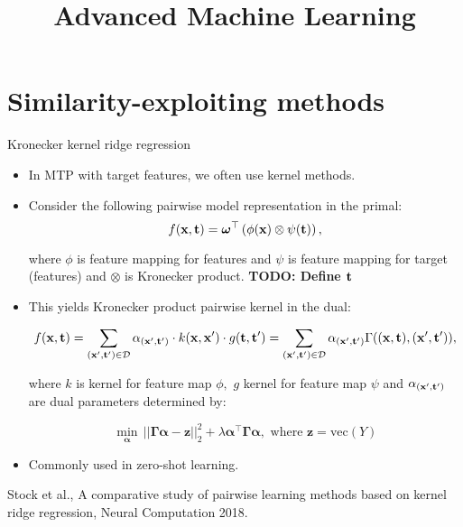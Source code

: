 \documentclass[11pt,compress,t,notes=noshow, xcolor=table]{beamer}
\title{Advanced Machine Learning}
\date{}
\begin{document}



\sloppy

\section{Similarity-exploiting methods}


\begin{frame}{Kronecker kernel ridge regression}
	\begin{itemize}

    	\item In MTP with target features, we often use kernel methods.
    
    	\item Consider the following pairwise model representation in the primal: 
    		\begin{equation*}
    			\label{eq:pairwise}
    			f(\mathbf{x},\mathbf{t}) = \bm\omega^\top \left(\phi(\mathbf{x}) \otimes \psi(\mathbf{t}) \right) ,
    		\end{equation*}
    
    	where $\phi$ is feature mapping for features and $\psi$ is feature mapping for target (features) and $\otimes$ is Kronecker product. \textbf{TODO: Define $\mathbf{t}$}
    
    	\item This yields Kronecker product pairwise kernel in the dual:
    	
    	\begin{eqnarray*} 
    		f(\mathbf{x},\mathbf{t})= \sum_{(\mathbf{x}',\mathbf{t}') \in \mathcal{D}} \alpha_{(\mathbf{x}',\mathbf{t}')}  \cdot  k(\mathbf{x},\mathbf{x}') \cdot g(\mathbf{t},\mathbf{t}')  = \sum_{(\mathbf{x}',\mathbf{t}') \in \mathcal{D}} \alpha_{(\mathbf{x}',\mathbf{t}')} \Gamma((\mathbf{x},\mathbf{t}),(\mathbf{x}',\mathbf{t}')),
    	\end{eqnarray*}
    
    	where $k$ is kernel for feature map $\phi,$  $g$ kernel for feature map $\psi$  and $\alpha_{(\mathbf{x}',\mathbf{t}')}$ are dual parameters determined by:
    
    	$$ \min_{\bm{\alpha}} \, ||\bm{\Gamma}\bm{\alpha} -\bm{z} ||^2_2 +\lambda\bm{\alpha }^\top \bm{\Gamma}\bm{\alpha}, \text{ where } \bm{z} = \mathrm{vec}{(Y)}$$
    
    
    
    	\item Commonly used in zero-shot learning.

\end{itemize}

	{\tiny Stock et al., A comparative study of pairwise learning methods based on kernel ridge regression, Neural Computation 2018.}
%	
\end{frame}
\end{document}
